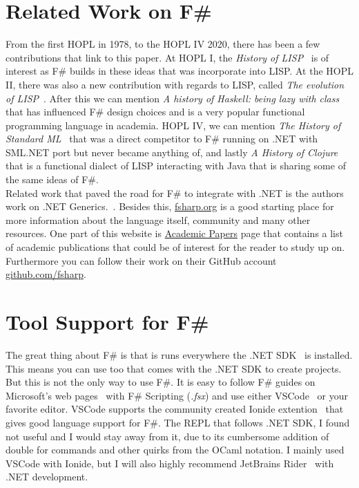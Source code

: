 \documentclass[12pt]{article}
\begin{document}
\newpage

\section{Related Work on F\#}

From the first HOPL in 1978, to the HOPL IV 2020, there has been a few contributions that link to this paper.
At HOPL I, the \textit{History of LISP}~\cite{mccarthy_history_1978} is of interest as F\# builds in these ideas that was incorporate into LISP. At the HOPL II, there was also a new contribution with regards to LISP, called \textit{The evolution of LISP}~\cite{steele_evolution_1993}. After this we can mention \textit{A history of Haskell: being lazy with class}~\cite{hudak_history_2007} that has influenced F\# design choices and is a very popular functional programming language in academia. HOPL IV, we can mention \textit{The History of Standard ML}~\cite{macqueen_history_2020} that was a direct competitor to F\# running on .NET with SML.NET port but never became anything of, and lastly \textit{A History of Clojure}~\cite{hickey_history_2020} that is a functional dialect of LISP interacting with Java that is sharing some of the same ideas of F\#.\\

Related work that paved the road for F\# to integrate with .NET is the authors work on .NET Generics.~\cite{syme_ilx_2001}. Besides this, \href{https://fsharp.org}{fsharp.org} is a good starting place for more information about the language itself, community and many other resources. One part of this website is 
\href{https://fsharp.org/teaching/research.html}{Academic Papers} page that contains a list of academic publications that could be of interest for the reader to study up on.
Furthermore you can follow their work on their GitHub account \href{https://github.com/fsharp}{github.com/fsharp}. \\

\section{Tool Support for F\#}
The great thing about F\# is that is runs everywhere the .NET SDK~\cite{dykstra_net_nodate} is installed.
This means you can use  too that comes with the .NET SDK to create projects.
But this is not the only way to use F\#. It is easy to follow F\# guides on Microsoft's web pages~\cite{carter_get_nodate} with F\# Scripting (\textit{.fsx}) and use either VSCode~\cite{microsoft_visual_nodate} or your favorite editor.
VSCode supports the community created Ionide extention~\cite{noauthor_ionide_nodate} that gives good language support for F\#. The REPL that follows .NET SDK, I found not useful and I would stay away from it, due to its cumbersome addition of double \codeblock{;;} for commands and other quirks from the OCaml notation.
I mainly used VSCode with Ionide, but I will also highly recommend JetBrains Rider~\cite{jetbrains_rider_nodate} with .NET development.
\end{document}
